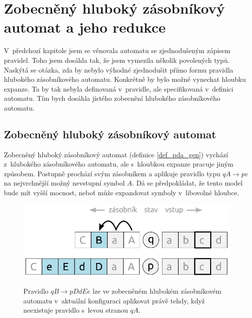 \chapter{Zobecněný hluboký zásobníkový automat a jeho redukce} \label{kap_pda_gen}

V~předchozí kapitole jsem se věnovala automatu se zjednodušeným zápisem pravidel. Toho jsem dosáhla tak, že jsem vymezila několik povolených typů.
Naskýtá se otázka, zda by nebylo výhodné zjednodušit přímo formu pravidla hlubokého zásobníkového automatu. Konkrétně by bylo možné vynechat hloubku expanze. Ta by tak nebyla definovaná v~pravidle, ale specifikovaná v~definici automatu. Tím bych dosáhla jistého zobecnění hlubokého zásobníkového automatu.

\section{Zobecněný hluboký zásobníkový automat}

Zobecněný hluboký zásobníkový automat (definice \ref{def_pda_gen}) vychází z~hlubokého zásobníkového automatu, ale s~hloubkou expanze pracuje jiným způsobem. Postupně prochází svým zásobníkem a aplikuje pravidlo typu $qA \rightarrow pv$ na nejvrchnější možný nevstupní symbol $A$. Dá se předpokládat, že tento model bude mít vyšší mocnost, neboť může expandovat symboly v~libovolné hloubce.

\begin{figure}[ht]
\centering
\includegraphics{img/bp_pda05.eps} \bigskip \\
\caption{Pravidlo $q B \rightarrow p DdEe$ lze ve zobecněném hlubokém zásobníkovém automatu v~aktuální konfiguraci aplikovat právě tehdy, když neexistuje pravidlo s~levou stranou $qA$.}
\end{figure}

